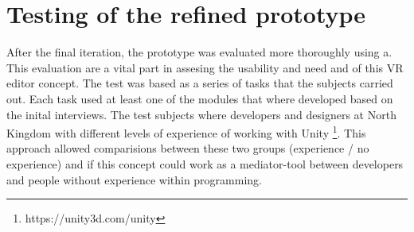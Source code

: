 \section{Testing of the refined prototype}
After the final iteration, the prototype was evaluated more thoroughly using a. This evaluation are a vital part in assesing the usability and need and of this VR editor concept. The test was based as a series of tasks that the subjects carried out. Each task used at least one of the modules that where developed based on the inital interviews. The test subjects where developers and designers at North Kingdom with different levels of experience of working with Unity \footnote{https://unity3d.com/unity}. This approach allowed comparisions between these two groups (experience / no experience) and if this concept could work as a mediator-tool between developers and people without experience within programming.
